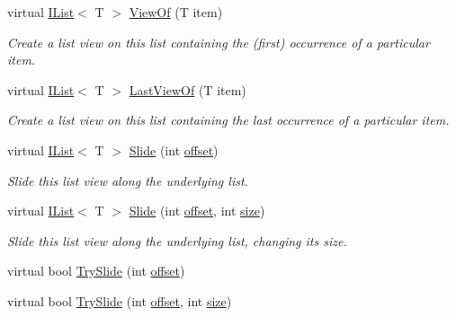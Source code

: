 \begin{DoxyCompactItemize}
virtual \hyperlink{interface_c5_1_1_i_list}{I\+List}$<$ T $>$ \hyperlink{class_c5_1_1_hashed_array_list_a3649fd58cf5e15c2ef488d61140895fd}{View\+Of} (T item)
\begin{DoxyCompactList}\small\item\em Create a list view on this list containing the (first) occurrence of a particular item. \end{DoxyCompactList}\item 
virtual \hyperlink{interface_c5_1_1_i_list}{I\+List}$<$ T $>$ \hyperlink{class_c5_1_1_hashed_array_list_a137af82d41074860aff0ccfaa67fac60}{Last\+View\+Of} (T item)
\begin{DoxyCompactList}\small\item\em Create a list view on this list containing the last occurrence of a particular item. \end{DoxyCompactList}\item 
virtual \hyperlink{interface_c5_1_1_i_list}{I\+List}$<$ T $>$ \hyperlink{class_c5_1_1_hashed_array_list_a0f24d23f3771a00a7e0d44da6de38932}{Slide} (int \hyperlink{class_c5_1_1_array_base_a2fff33ea372907c015262a3041b2f2af}{offset})
\begin{DoxyCompactList}\small\item\em Slide this list view along the underlying list. \end{DoxyCompactList}\item 
virtual \hyperlink{interface_c5_1_1_i_list}{I\+List}$<$ T $>$ \hyperlink{class_c5_1_1_hashed_array_list_a4b7f5fd43d17df77bded775e5d4ec6f6}{Slide} (int \hyperlink{class_c5_1_1_array_base_a2fff33ea372907c015262a3041b2f2af}{offset}, int \hyperlink{class_c5_1_1_collection_base_ab524b118754a5a8290b6528511272833}{size})
\begin{DoxyCompactList}\small\item\em Slide this list view along the underlying list, changing its size. \end{DoxyCompactList}\item 
virtual bool \hyperlink{class_c5_1_1_hashed_array_list_ae54510e056acda06d247570c08b72a4f}{Try\+Slide} (int \hyperlink{class_c5_1_1_array_base_a2fff33ea372907c015262a3041b2f2af}{offset})
\item 
virtual bool \hyperlink{class_c5_1_1_hashed_array_list_a443cbdd709e526aa841cb53518a2025c}{Try\+Slide} (int \hyperlink{class_c5_1_1_array_base_a2fff33ea372907c015262a3041b2f2af}{offset}, int \hyperlink{class_c5_1_1_collection_base_ab524b118754a5a8290b6528511272833}{size})
\item 

\end{DoxyCompactItemize}
